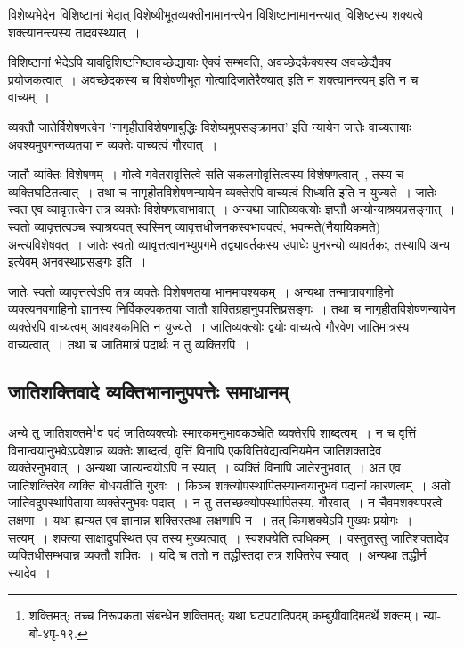			विशेष्यभेदेन विशिष्टानां भेदात् विशेष्यीभूतव्यक्तीनामानन्त्येन विशिष्टानामानन्त्यात् विशिष्टस्य शक्यत्वे शक्त्यानन्त्यस्य तादवस्थ्यात्~।

			विशिष्टानां भेदेऽपि यावद्विशिष्टनिष्ठावच्छेद्यायाः ऐक्यं सम्भवति, अवच्छेदकैक्यस्य अवच्छेद्यैक्य प्रयोजकत्वात्~। अवच्छेदकस्य च विशेषणीभूत गोत्वादिजातेरैक्यात् इति न शक्त्यानन्त्यम् इति न च वाच्यम्~।

			व्यक्तौ जातेर्विशेषणत्वेन 'नागृहीतविशेषणाबुद्धिः विशेष्यमुपसङ्क्रामत' इति न्यायेन जातेः वाच्यतायाः अवश्यमुपगन्तव्यतया न व्यक्तेः वाच्यत्वं गौरवात्~।

			जातौ व्यक्तिः विशेषणम्~। गोत्वे गवेतरावृत्तित्वे सति सकलगोवृत्तित्वस्य विशेषणत्वात्~, तस्य च व्यक्तिघटितत्वात्~। तथा च नागृहीतविशेषणन्यायेन व्यक्तेरपि वाच्यत्वं सिध्यति इति न युज्यते~। जातेः स्वत एव व्यावृत्तत्वेन तत्र व्यक्तेः विशेषणत्वाभावात्~। अन्यथा जातिव्यक्त्योः ज्ञप्तौ अन्योन्याश्रयप्रसङ्गात्~। स्वतो व्यावृत्तत्वञ्च स्वाश्रयवत् स्वस्मिन् व्यावृत्तधीजनकस्वभाववत्वं, भवन्मते(नैयायिकमते) अन्त्यविशेषवत्~। जातेः स्वतो व्यावृत्तत्वानभ्युपगमे तद्व्यावर्तकस्य उपाधेः पुनरन्यो व्यावर्तकः, तस्यापि अन्य इत्येवम् अनवस्थाप्रसङ्गः इति~।

			जातेः स्वतो व्यावृत्तत्वेऽपि तत्र व्यक्तेः विशेषणतया भानमावश्यकम्~। अन्यथा तन्मात्रावगाहिनो व्यक्त्यनवगाहिनो ज्ञानस्य निर्विकल्पकतया जातौ शक्तिग्रहानुपपत्तिप्रसङ्गः~। तथा च नागृहीतविशेषणन्यायेन व्यक्तेरपि वाच्यत्वम् आवश्यकमिति न युज्यते~। जातिव्यक्त्योः द्वयोः वाच्यत्वे गौरवेण जातिमात्रस्य वाच्यत्वात्~। तथा च जातिमात्रं पदार्थः न तु व्यक्तिरपि~।

		\subsection{जातिशक्तिवादे व्यक्तिभानानुपपत्तेः समाधानम्}

			\begin{small}
	
				अन्ये तु जातिशक्तमे\footnote{शक्तिमत्; तच्च निरूपकता संबन्धेन शक्तिमत्; यथा घटपटादिपदम् कम्बुग्रीवादिमदर्थे शक्तम्। न्या-बो-४पृ-१९.}व पदं जातिव्यक्त्योः स्मारकमनुभावकञ्चेति व्यक्तेरपि शाब्दत्वम्~। न च वृत्तिं विनान्वयानुभवेऽप्रवेशान्न व्यक्तेः शाब्दत्वं, वृत्तिं विनापि एकवित्तिवेद्यत्वनियमेन जातिशक्तादेव व्यक्तेरनुभवात्~। अन्यथा जात्यन्वयोऽपि न स्यात्~। व्यक्तिं विनापि जातेरनुभवात्~। अत एव जातिशक्तिरेव व्यक्तिं बोधयतीति गुरवः~। किञ्च शक्त्योपस्थापितस्यान्वयानुभवं पदानां कारणत्वम्~। अतो जातिवदुपस्थापिताया व्यक्तेरनुभवः पदात्~। न तु तत्तच्छक्योपस्थापितस्य, गौरवात्~। न चैवमशक्यपरत्वे लक्षणा~। यथा ह्यन्यत एव ज्ञानान्न शक्तिस्तथा लक्षणापि न~। तत् किमशक्येऽपि मुख्यः प्रयोगः~। सत्यम्~। शक्त्या साक्षादुपस्थित एव तस्य मुख्यत्वात्~। स्वशक्येति त्वधिकम्~। वस्तुतस्तु जातिशक्तादेव व्यक्तिधीसम्भवान्न व्यक्तौ शक्तिः~। यदि च ततो न तद्धीस्तदा तत्र शक्तिरेव स्यात्~। अन्यथा तद्धीर्न स्यादेव~। 
			\end{small}


